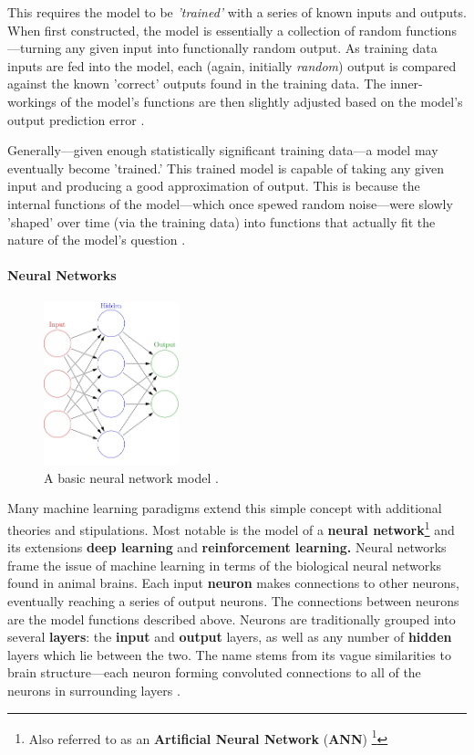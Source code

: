 \documentclass{report}
\newcommand{\tech}[1]{\textbf{#1}}
\begin{document}
This requires the model to be \emph{'trained'} with a series of known inputs and outputs. When first constructed, the model is essentially a collection of random functions---turning any given input into functionally random output. As training data inputs are fed into the model, each (again, initially \emph{random}) output is compared against the known 'correct' outputs found in the training data. The inner-workings of the model's functions are then slightly adjusted based on the model's output prediction error \cite{jordan2015machine}. 

Generally---given enough statistically significant training data---a model may eventually become 'trained.' This trained model is capable of taking any given input and producing a good approximation of output. This is because the internal functions of the model---which once spewed random noise---were slowly 'shaped' over time (via the training data) into functions that actually fit the nature of the model's question \cite{mahesh2020machine}. 

\paragraph{Neural Networks}

\begin{figure}
    \centering
    \includegraphics[width=0.35\textwidth]{neural.png}
    \caption{A basic neural network model \cite{neural}.}
    \label{fig:neural}
\end{figure}


Many machine learning paradigms extend this simple concept with additional theories and stipulations. Most notable is the model of a \tech{neural network}\footnote{Also referred to as an \tech{Artificial Neural Network} (\tech{ANN}) \footnote{abiodun2018state}} and its extensions \tech{deep learning} and \tech{reinforcement learning.} Neural networks frame the issue of machine learning in terms of the biological neural networks found in animal brains. Each input \tech{neuron} makes connections to other neurons, eventually reaching a series of output neurons. The connections between neurons are the model functions described above. Neurons are traditionally grouped into several \tech{layers}: the \tech{input} and \tech{output} layers, as well as any number of \tech{hidden} layers which lie between the two. The name stems from its vague similarities to brain structure---each neuron forming convoluted connections to all of the neurons in surrounding layers \cite{dongare2012introduction}.
\end{document}
